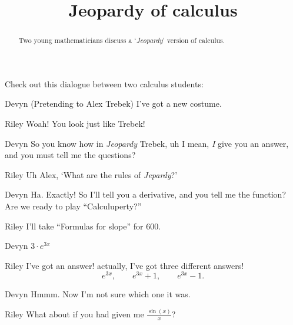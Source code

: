 \documentclass{ximera}
\title[Break-Ground:]{Jeopardy of calculus}
\begin{document}
\begin{abstract}
  Two young mathematicians discuss a `\textit{Jeopardy}' version of calculus.
\end{abstract}
\maketitle

Check out this dialogue between two calculus students:


\begin{dialogue}
\item[Devyn] (Pretending to Alex Trebek) I've got a new costume.
\item[Riley] Woah! You look just like Trebek!
\item[Devyn] So you know how in \textit{Jeopardy} Trebek, uh I mean, \textit{I} give you an answer, and you must tell me the questions?
\item[Riley] Uh Alex, `What are the rules of \textit{Jepardy}?'
\item[Devyn] Ha. Exactly! So I'll tell you a derivative, and you tell
  me the function? Are we ready to play ``Calculuperty?''
\item[Riley] I'll take ``Formulas for slope'' for $600$.
\item[Devyn] $3\cdot e^{3x}$  
\item[Riley] I've got an answer!  actually, I've got three different answers!
  \[
  e^{3x},\qquad e^{3x}+1,\qquad e^{3x}-1.
  \]
\item[Devyn] Hmmm. Now I'm not sure which one it was.
\item[Riley] What about if you had given me $\frac{\sin(x)}{x}$?
\end{dialogue}


\begin{problem}
\end{problem}



\end{document}
